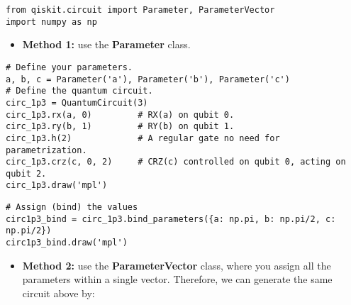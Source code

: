 \documentclass[%
oneside,                 %
final,                   %
10pt]{article}
\begin{document}
\begin{verbatim}
from qiskit.circuit import Parameter, ParameterVector
import numpy as np

\end{verbatim}


\begin{itemize}
\item \textbf{Method 1:} use the \textbf{Parameter} class. 
\end{itemize}

\noindent










\begin{verbatim}
# Define your parameters.
a, b, c = Parameter('a'), Parameter('b'), Parameter('c')
# Define the quantum circuit.
circ_1p3 = QuantumCircuit(3)
circ_1p3.rx(a, 0)         # RX(a) on qubit 0.
circ_1p3.ry(b, 1)         # RY(b) on qubit 1.
circ_1p3.h(2)             # A regular gate no need for parametrization.
circ_1p3.crz(c, 0, 2)     # CRZ(c) controlled on qubit 0, acting on qubit 2.
circ_1p3.draw('mpl')

\end{verbatim}






\begin{verbatim}
# Assign (bind) the values
circ1p3_bind = circ_1p3.bind_parameters({a: np.pi, b: np.pi/2, c: np.pi/2})
circ1p3_bind.draw('mpl')

\end{verbatim}


\begin{itemize}
\item \textbf{Method 2:} use the \textbf{ParameterVector} class, where you assign all the parameters within a single vector. Therefore, we can generate the same circuit above by:
\end{itemize}

\noindent
\end{document}
